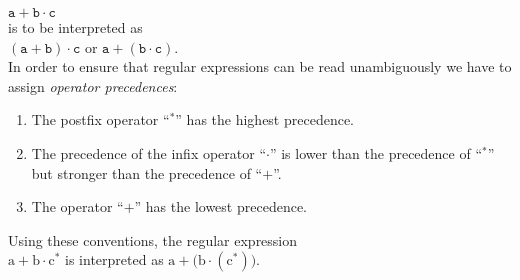 \hspace*{1.3cm}
$\mathtt{a}+\mathtt{b}\cdot\mathtt{c}$ 
\\[0.2cm]
is to be interpreted as 
\\[0.2cm]
\hspace*{1.3cm}
$(\mathtt{a}+\mathtt{b})\cdot\mathtt{c}$ \quad or \quad $\mathtt{a}+(\mathtt{b}\cdot\mathtt{c})$.
\\[0.2cm]
In order to ensure that regular expressions can be read unambiguously we have to assign \emph{operator precedences}:
\begin{enumerate}
\item The postfix operator ``$^*$'' has the highest precedence.
\item The precedence of the infix operator ``$\cdot$'' is lower than the precedence of  ``$^*$'' but
      stronger than the precedence of ``$+$''.
\item The operator ``$+$'' has the lowest precedence.
\end{enumerate}
Using these conventions, the regular expression 
\\[0.2cm]
\hspace*{1.3cm}
$\mathrm{a} + \mathrm{b} \cdot \mathrm{c}^*$ \quad is interpreted as  \quad
$\mathrm{a} + \bigl(\mathrm{b} \cdot (\mathrm{c}^*)\bigr)$.

